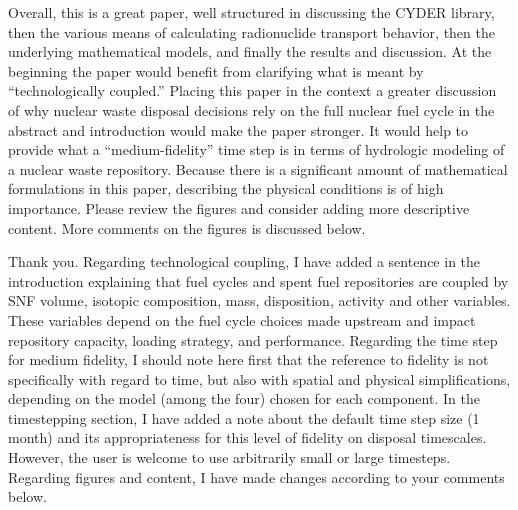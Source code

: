 \documentclass[answers,12pt]{exam}
\begin{document}
\begin{questions}
\question
Overall,  this  is  a  great  paper,  well  structured  in  discussing  the  
CYDER  library,  then  the  various  means  of calculating  radionuclide  
transport  behavior,  then  the  underlying  mathematical  models,  and  
finally  the  results and  discussion.  At  the  beginning  the  paper  would  
benefit  from  clarifying  what  is  meant  by  ``technologically coupled.''  
Placing  this  paper  in  the  context  a  greater  discussion  of  why  
nuclear  waste  disposal  decisions  rely on  the  full  nuclear  fuel  cycle  
in  the  abstract  and  introduction  would  make  the  paper stronger.  It 
would help to  provide  what  a  ``medium-fidelity''  time  step  is  in  terms  
of  hydrologic  modeling  of  a  nuclear  waste repository.  Because  there  is  
a  significant  amount  of  mathematical  formulations  in  this  paper,  
describing  the physical  conditions  is  of  high  importance.  Please  review  
the  figures  and  consider  adding  more  descriptive content. More comments 
on the figures is discussed below.  \begin{solution}
Thank you.
        Regarding technological coupling, I have added a sentence in the 
        introduction explaining that fuel cycles and spent fuel repositories 
        are coupled by SNF volume, isotopic composition, mass, disposition, 
        activity and other variables. These variables depend on the fuel cycle 
        choices made upstream and impact repository capacity, loading strategy, 
        and performance.  Regarding the time step for medium fidelity, I should 
        note here first that the reference to fidelity is not specifically with 
        regard to time, but also with spatial and physical simplifications, 
        depending on the model (among the four) chosen for each component. In 
        the timestepping section, I have added a note about the default time 
        step size (1 month) and its appropriateness for this level of fidelity 
        on disposal timescales.  However, the user is welcome to use 
        arbitrarily small or large timesteps.  Regarding figures and content, I 
        have made changes according to your comments below.
\end{solution} 


\end{questions}
\end{document}
